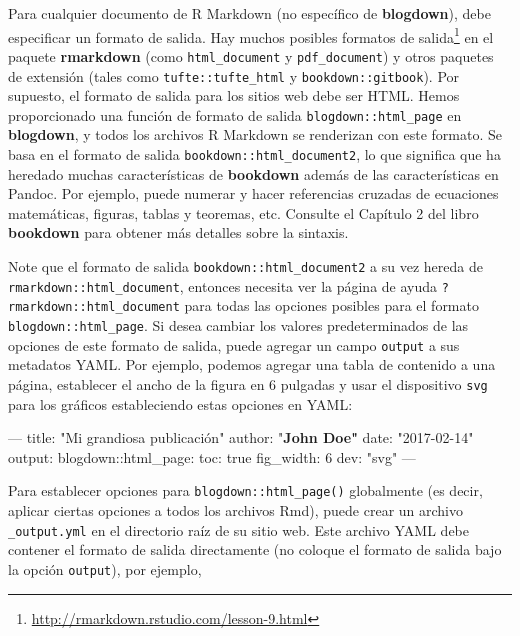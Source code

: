 \documentclass[12pt,]{krantz}
\makeatletter
\newenvironment{Shaded}{\begin{snugshade}}{\end{snugshade}}
\newcommand{\AttributeTok}[1]{\textcolor[rgb]{0.77,0.63,0.00}{#1}}
\newcommand{\ErrorTok}[1]{\textcolor[rgb]{0.64,0.00,0.00}{\textbf{#1}}}
\newcommand{\FunctionTok}[1]{\textcolor[rgb]{0.00,0.00,0.00}{#1}}
\newcommand{\OtherTok}[1]{\textcolor[rgb]{0.56,0.35,0.01}{#1}}
\newcommand{\StringTok}[1]{\textcolor[rgb]{0.31,0.60,0.02}{#1}}
\renewcommand{\href}[2]{#2\footnote{\url{#1}}}
\newenvironment{kframe}{%
\medskip{}
\setlength{\fboxsep}{.8em}
 \def\at@end@of@kframe{}%
 \ifinner\ifhmode%
  \def\at@end@of@kframe{\end{minipage}}%
  \begin{minipage}{\columnwidth}%
 \fi\fi%
 \def\FrameCommand##1{\hskip\@totalleftmargin \hskip-\fboxsep
 \colorbox{shadecolor}{##1}\hskip-\fboxsep
     \hskip-\linewidth \hskip-\@totalleftmargin \hskip\columnwidth}%
 \MakeFramed {\advance\hsize-\width
   \@totalleftmargin\z@ \linewidth\hsize
   \@setminipage}}%
 {\par\unskip\endMakeFramed%
 \at@end@of@kframe}
\renewenvironment{Shaded}{\begin{kframe}}{\end{kframe}}
\theoremstyle{definition}
\theoremstyle{definition}
\theoremstyle{definition}
\theoremstyle{remark}
\makeatother
\begin{document}
Para cualquier documento de R Markdown (no específico de
\textbf{blogdown}), debe especificar un formato de salida. Hay muchos
posibles \href{http://rmarkdown.rstudio.com/lesson-9.html}{formatos de
salida} en el paquete \textbf{rmarkdown} (como \texttt{html\_document} y
\texttt{pdf\_document}) y otros paquetes de extensión (tales como
\texttt{tufte::tufte\_html} y \texttt{bookdown::gitbook}). Por supuesto,
el formato de salida para los sitios web debe ser HTML. Hemos
proporcionado una función de formato de salida
\texttt{blogdown::html\_page} en \textbf{blogdown}, y todos los archivos
R Markdown se renderizan con este formato. Se basa en el formato de
salida \texttt{bookdown::html\_document2}, lo que significa que ha
heredado muchas características de \textbf{bookdown} además de las
características en Pandoc. Por ejemplo, puede numerar y hacer
referencias cruzadas de ecuaciones matemáticas, figuras, tablas y
teoremas, etc. Consulte el Capítulo 2 del libro \textbf{bookdown}
\citep{xie2016} para obtener más detalles sobre la sintaxis.

Note que el formato de salida \texttt{bookdown::html\_document2} a su
vez hereda de \texttt{rmarkdown::html\_document}, entonces necesita ver
la página de ayuda \texttt{?rmarkdown::html\_document} para todas las
opciones posibles para el formato \texttt{blogdown::html\_page}. Si
desea cambiar los valores predeterminados de las opciones de este
formato de salida, puede agregar un campo \texttt{output} a sus
metadatos YAML. Por ejemplo, podemos agregar una tabla de contenido a
una página, establecer el ancho de la figura en 6 pulgadas y usar el
dispositivo \texttt{svg} para los gráficos estableciendo estas opciones
en YAML:

\begin{Shaded}
\begin{Highlighting}[]
\OtherTok{---}
\FunctionTok{title:}\AttributeTok{ }\StringTok{"Mi grandiosa publicación"}
\StringTok{author: "}\ErrorTok{John Doe"}
\FunctionTok{date:}\AttributeTok{ }\StringTok{"2017-02-14"}
\FunctionTok{output:}
  \FunctionTok{blogdown:}\AttributeTok{:html_page:}
    \FunctionTok{toc:}\AttributeTok{ true}
    \FunctionTok{fig_width:}\AttributeTok{ 6}
    \FunctionTok{dev:}\AttributeTok{ }\StringTok{"svg"}
\OtherTok{---}
\end{Highlighting}
\end{Shaded}

Para establecer opciones para \texttt{blogdown::html\_page()}
globalmente (es decir, aplicar ciertas opciones a todos los archivos
Rmd), puede crear un archivo \texttt{\_output.yml} en el directorio raíz
de su sitio web. Este archivo YAML debe contener el formato de salida
directamente (no coloque el formato de salida bajo la opción
\texttt{output}), por ejemplo,
\end{document}

